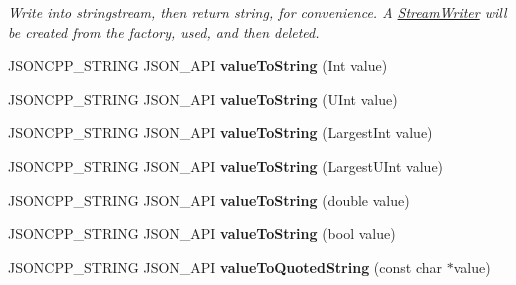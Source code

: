 \begin{DoxyCompactItemize}
\begin{DoxyCompactList}\small\item\em Write into stringstream, then return string, for convenience. A \hyperlink{classJson_1_1StreamWriter}{Stream\+Writer} will be created from the factory, used, and then deleted. \end{DoxyCompactList}\item 
J\+S\+O\+N\+C\+P\+P\+\_\+\+S\+T\+R\+I\+NG J\+S\+O\+N\+\_\+\+A\+PI {\bfseries value\+To\+String} (Int value)\hypertarget{namespaceJson_a498503e8f49d6a3811e3c9f6757da60d}{}\label{namespaceJson_a498503e8f49d6a3811e3c9f6757da60d}

\item 
J\+S\+O\+N\+C\+P\+P\+\_\+\+S\+T\+R\+I\+NG J\+S\+O\+N\+\_\+\+A\+PI {\bfseries value\+To\+String} (U\+Int value)\hypertarget{namespaceJson_ab2cb54f173193c8d27c3eb7f10b6e79a}{}\label{namespaceJson_ab2cb54f173193c8d27c3eb7f10b6e79a}

\item 
J\+S\+O\+N\+C\+P\+P\+\_\+\+S\+T\+R\+I\+NG J\+S\+O\+N\+\_\+\+A\+PI {\bfseries value\+To\+String} (Largest\+Int value)\hypertarget{namespaceJson_a4732517cb28d203cfd4354d05952a81b}{}\label{namespaceJson_a4732517cb28d203cfd4354d05952a81b}

\item 
J\+S\+O\+N\+C\+P\+P\+\_\+\+S\+T\+R\+I\+NG J\+S\+O\+N\+\_\+\+A\+PI {\bfseries value\+To\+String} (Largest\+U\+Int value)\hypertarget{namespaceJson_a6283ea3db02efe9104ae6baff698245a}{}\label{namespaceJson_a6283ea3db02efe9104ae6baff698245a}

\item 
J\+S\+O\+N\+C\+P\+P\+\_\+\+S\+T\+R\+I\+NG J\+S\+O\+N\+\_\+\+A\+PI {\bfseries value\+To\+String} (double value)\hypertarget{namespaceJson_a3cf0c8dbbdb898c4a6fad54670b34bd1}{}\label{namespaceJson_a3cf0c8dbbdb898c4a6fad54670b34bd1}

\item 
J\+S\+O\+N\+C\+P\+P\+\_\+\+S\+T\+R\+I\+NG J\+S\+O\+N\+\_\+\+A\+PI {\bfseries value\+To\+String} (bool value)\hypertarget{namespaceJson_a0a706a1fffba4fe8a8c1ef75b2dbbfab}{}\label{namespaceJson_a0a706a1fffba4fe8a8c1ef75b2dbbfab}

\item 
J\+S\+O\+N\+C\+P\+P\+\_\+\+S\+T\+R\+I\+NG J\+S\+O\+N\+\_\+\+A\+PI {\bfseries value\+To\+Quoted\+String} (const char $\ast$value)\hypertarget{namespaceJson_aaf777a6923bcb4cf63a2729973fe5315}{}\label{namespaceJson_aaf777a6923bcb4cf63a2729973fe5315}


\end{DoxyCompactItemize}
